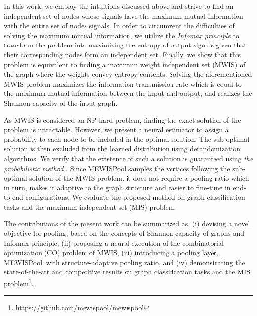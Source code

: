 \documentclass{article}
\begin{document}
In this work, we employ the intuitions discussed above and strive to find an independent set of nodes whose signals have the maximum mutual information with the entire set of nodes signals. In order to circumvent the difficulties of solving the maximum mutual information, we utilize the \textit{Infomax principle} \cite{haykin, linkster, infomax} to transform the problem into maximizing the entropy of output signals given that their corresponding nodes form an independent set. Finally, we show that this problem is equivalent to finding a maximum weight independent set (MWIS) of the graph where the weights convey entropy contents. Solving the aforementioned MWIS problem maximizes the information transmission rate which is equal to the maximum mutual information between the input and output, and realizes the Shannon capacity of the input graph.

As MWIS is considered an NP-hard problem, finding the exact solution of the problem is intractable. However, we present a neural estimator to assign a probability to each node to be included in the optimal solution. The sub-optimal solution is then excluded from the learned distribution using derandomization algorithms. We verify that the existence of such a solution is guaranteed using \textit{the probabilistic method} \cite{erdos1959graph, probabilisticmethod}. Since MEWISPool samples the vertices following the sub-optimal solution of the MWIS problem, it does not require a pooling ratio which in turn, makes it adaptive to the graph structure and easier to fine-tune in end-to-end configurations. We evaluate the proposed method on graph classification tasks and the maximum independent set (MIS) problem. 

The contributions of the present work can be summarized as, (i) devising a novel objective for pooling, based on the concepts of Shannon capacity of graphs and Infomax principle, (ii) proposing a neural execution of the combinatorial optimization (CO) problem of MWIS, (iii) introducing a pooling layer, MEWISPool, with structure-adaptive pooling ratio, and (iv) demonstrating the state-of-the-art and competitive results on graph classification tasks and the MIS problem\footnote{\url{https://github.com/mewispool/mewispool}}.
\end{document}
